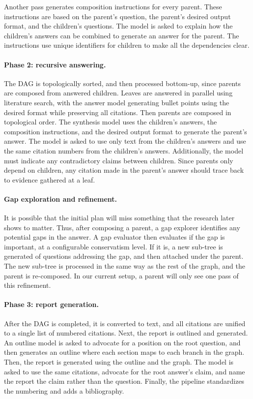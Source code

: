 Another pass generates composition instructions for every parent. These instructions are based on the parent's question, the parent's desired output format, and the children's questions. The model is asked to explain how the children's answers can be combined to generate an answer for the parent. The instructions use unique identifiers for children to make all the dependencies clear.

\paragraph{Phase 2: recursive answering.}
The DAG is topologically sorted, and then processed bottom-up, since parents are composed from answered children. Leaves are answered in parallel using literature search, with the answer model generating bullet points using the desired format while preserving all citations. Then parents are composed in topological order. The synthesis model uses the children's answers, the composition instructions, and the desired output format to generate the parent's answer. The model is asked to use only text from the children's answers and use the same citation numbers from the children's answers. Additionally, the model must indicate any contradictory claims between children. Since parents only depend on children, any citation made in the parent's answer should trace back to evidence gathered at a leaf.

\paragraph{Gap exploration and refinement.}
It is possible that the initial plan will miss something that the research later shows to matter. Thus, after composing a parent, a gap explorer identifies any potential gaps in the answer. A gap evaluator then evaluates if the gap is important, at a configurable conservatism level. If it is, a new sub-tree is generated of questions addressing the gap, and then attached under the parent. The new sub-tree is processed in the same way as the rest of the graph, and the parent is re-composed. In our current setup, a parent will only see one pass of this refinement.

\paragraph{Phase 3: report generation.}
After the DAG is completed, it is converted to text, and all citations are unified to a single list of numbered citations. Next, the report is outlined and generated. An outline model is asked to advocate for a position on the root question, and then generates an outline where each section maps to each branch in the graph. Then, the report is generated using the outline and the graph. The model is asked to use the same citations, advocate for the root answer's claim, and name the report the claim rather than the question. Finally, the pipeline standardizes the numbering and adds a bibliography.

